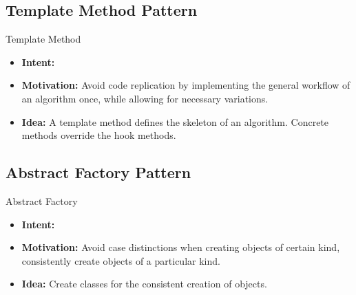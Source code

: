 \subsection{Template Method Pattern}
\begin{frame}{\myframetitle}
	\begin{mycolumns}[widths={40}]
		\begin{definition}{Template Method }
			\begin{itemize}
				\item {\bf Intent:} 
				\item {\bf Motivation:}  Avoid code replication by implementing the general workflow of an algorithm once, while allowing for necessary variations.
				\item {\bf Idea:} A template method defines the skeleton of an algorithm. Concrete methods override the hook methods.
			\end{itemize}
		\end{definition}
	\mynextcolumn
	\end{mycolumns}
\end{frame}

\subsection{Abstract Factory Pattern}
\begin{frame}{\myframetitle}
	\begin{mycolumns}[widths={40}]
		\begin{definition}{Abstract Factory }
			\begin{itemize}
				\item {\bf Intent:} 
				\item {\bf Motivation:} Avoid case distinctions when creating objects of certain kind, consistently create objects of a particular kind.
				\item {\bf Idea:} Create classes for the consistent creation of objects.
			\end{itemize}
		\end{definition}
	\mynextcolumn
	\end{mycolumns}
\end{frame}


